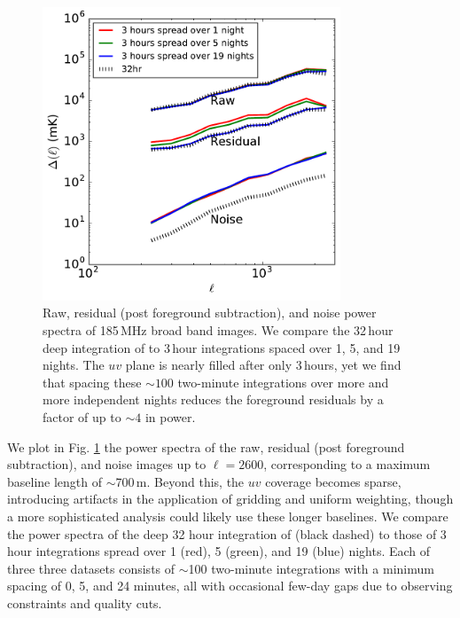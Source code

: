 \documentclass[numberedappendix]{emulateapj}
\begin{document}
\begin{figure}[h]
\centering
\includegraphics[width=3.5in]{images/res_pspec_of_100_obsids_with_diff_spacings_6amin.pdf}
\caption{Raw, residual (post foreground subtraction), and noise power spectra of 185\,MHz broad band images. We compare the 32\,hour deep integration of \citet{beardsley16} to 3\,hour integrations spaced over 1, 5, and 19 nights. The $uv$ plane is nearly filled after only 3\,hours, yet we find that spacing these $\sim100$ two-minute integrations over more and more independent nights reduces the foreground residuals by a factor of up to $\sim4$ in power.}
\label{fig:respspecspacingsstudy}
\end{figure}

We plot in Fig. \ref{fig:respspecspacingsstudy} the power spectra of the raw, residual (post foreground subtraction), and noise images up to $\ell=2600$, corresponding to a maximum baseline length of $\sim$700\,m. Beyond this, the $uv$ coverage becomes sparse, introducing artifacts in the application of gridding and uniform weighting, though a more sophisticated analysis could likely use these longer baselines. We compare the power spectra of the deep 32 hour integration of \citet{beardsley16} (black dashed) to those of 3 hour integrations spread over 1 (red), 5 (green), and 19 (blue) nights. Each of three three datasets consists of $\sim$100 two-minute integrations with a minimum spacing of 0, 5, and 24 minutes, all with occasional few-day gaps due to observing constraints and quality cuts. 
\end{document}
